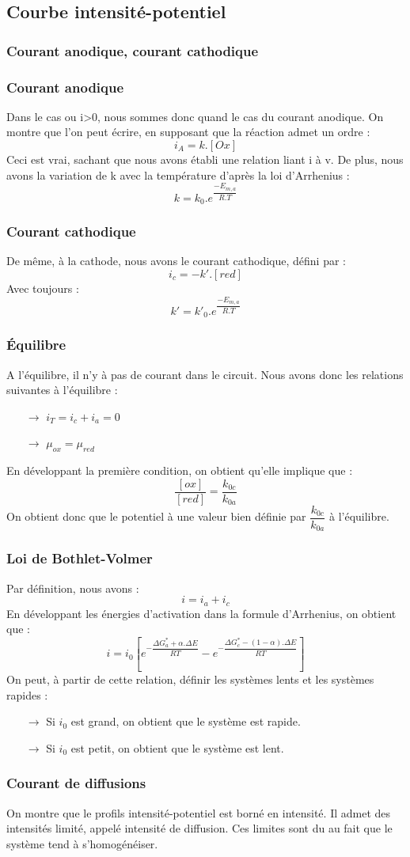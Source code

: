\subsection{Courbe intensité-potentiel}
\subsubsection{Courant anodique, courant cathodique}
\subsubsection{Courant anodique}
Dans le cas ou i>0, nous sommes donc quand le cas du courant anodique. On montre que l'on peut écrire, en supposant que la réaction admet un ordre : 
$$i_A = k.[Ox]$$
Ceci est vrai, sachant que nous avons établi une relation liant i à v. De plus, nous avons la variation de k avec la température d'après la loi d'Arrhenius : 
$$k = k_0.e^{\dfrac{-E_{m,a}}{R.T}}$$
\subsubsection{Courant cathodique}
De même, à la cathode, nous avons le courant cathodique, défini par : 
$$i_c = - k'.[red]$$
Avec toujours : 
$$k' = k'_0.e^{\dfrac{-E_{m,a}}{R.T}}$$
\subsubsection{Équilibre}
A l'équilibre, il n'y à pas de courant dans le circuit. Nous avons donc les relations suivantes à l'équilibre : \begin{itemize}
 \item[$\rightarrow$] $i_T = i_c + i_a = 0$
 \item[$\rightarrow$] $\mu_{ox} = \mu_{red}$
\end{itemize}
En développant la première condition, on obtient qu'elle implique que : 
$$\dfrac{[ox]}{[red]}=\dfrac{k_{0c}}{k_{0a}}$$
On obtient donc que le potentiel à une valeur bien définie par $\dfrac{k_{0c}}{k_{0a}}$ à l'équilibre.
\subsubsection{Loi de Bothlet-Volmer}
Par définition, nous avons :
$$i = i_a + i_c$$
En développant les énergies d'activation dans la formule d'Arrhenius, on obtient que : 
$$i = i_0[e^{-\dfrac{\Delta G_a^* + \alpha.\Delta E}{RT}} - e^{-\dfrac{\Delta G_c^* - (1 - \alpha).\Delta E}{RT}}]$$
On peut, à partir de cette relation, définir les systèmes lents et les systèmes rapides : 
\begin{itemize}
 \item[$\rightarrow$] Si $i_0$ est grand, on obtient que le système est rapide.
 \item[$\rightarrow$] Si $i_0$ est petit, on obtient que le système est lent.
\end{itemize}
\subsubsection{Courant de diffusions}
On montre que le profils intensité-potentiel est borné en intensité. Il admet des intensités limité, appelé intensité de diffusion. Ces limites sont du au fait que le système tend à s'homogénéiser.
